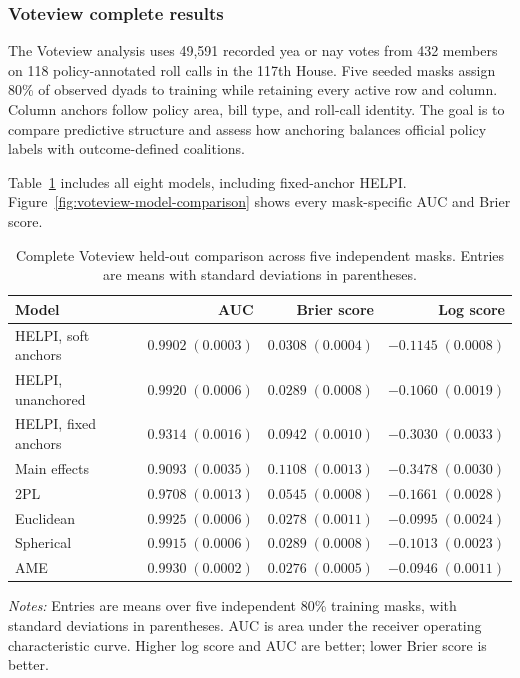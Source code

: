 \documentclass[
  12pt]{article}
\newcommand{\TableNote}[1]{%
  \par\vspace{0.35em}\noindent
  \begin{minipage}{0.96\linewidth}
    \footnotesize\setstretch{1.05}\raggedright
    \textit{Notes:} #1
  \end{minipage}%
  \par\vspace{0.6\baselineskip}%
}
\theoremstyle{definition}
\theoremstyle{plain}
\begin{document}
\subsubsection{Voteview complete results}

The Voteview analysis uses 49,591 recorded yea or nay votes from 432 members on 118 policy-annotated roll calls in the 117th House.
Five seeded masks assign 80\% of observed dyads to training while retaining every active row and column.
Column anchors follow policy area, bill type, and roll-call identity.
The goal is to compare predictive structure and assess how anchoring balances official policy labels with outcome-defined coalitions.

Table~\ref{tab:voteview-full} includes all eight models, including fixed-anchor HELPI.
Figure~\ref{fig:voteview-model-comparison} shows every mask-specific AUC and Brier score.

\begin{table}[H]
	\centering
	\small
	\caption{Complete Voteview held-out comparison across five independent masks. Entries are means with standard deviations in parentheses.}
	\label{tab:voteview-full}
	\begin{tabular}{lrrr}
\toprule
Model & AUC & Brier score & Log score \\
\midrule
HELPI, soft anchors & $0.9902\;(0.0003)$ & $0.0308\;(0.0004)$ & $-0.1145\;(0.0008)$ \\
HELPI, unanchored & $0.9920\;(0.0006)$ & $0.0289\;(0.0008)$ & $-0.1060\;(0.0019)$ \\
HELPI, fixed anchors & $0.9314\;(0.0016)$ & $0.0942\;(0.0010)$ & $-0.3030\;(0.0033)$ \\
Main effects & $0.9093\;(0.0035)$ & $0.1108\;(0.0013)$ & $-0.3478\;(0.0030)$ \\
2PL & $0.9708\;(0.0013)$ & $0.0545\;(0.0008)$ & $-0.1661\;(0.0028)$ \\
Euclidean & $0.9925\;(0.0006)$ & $0.0278\;(0.0011)$ & $-0.0995\;(0.0024)$ \\
Spherical & $0.9915\;(0.0006)$ & $0.0289\;(0.0008)$ & $-0.1013\;(0.0023)$ \\
AME & $0.9930\;(0.0002)$ & $0.0276\;(0.0005)$ & $-0.0946\;(0.0011)$ \\
\bottomrule
\end{tabular}

	\TableNote{Entries are means over five independent 80\% training masks, with standard deviations in parentheses. AUC is area under the receiver operating characteristic curve. Higher log score and AUC are better; lower Brier score is better.}
\end{table}
\end{document}

